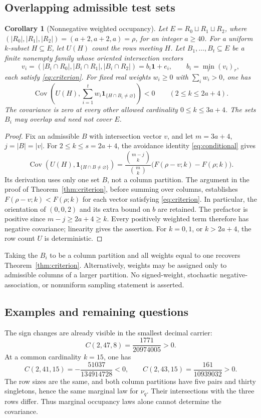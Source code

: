 \documentclass[11pt,a4paper]{article}
\newtheorem{corollary}[theorem]{Corollary}
\theoremstyle{remark}
\DeclareMathOperator{\Cov}{Cov}
\newcommand{\one}{\mathbf 1}
\numberwithin{equation}{section}
\begin{document}
\subsection{Overlapping admissible test sets}

\begin{corollary}[Nonnegative weighted occupancy]\label{cor:weighted}
Let \(E=R_0\sqcup R_1\sqcup R_2\), where
\((|R_0|,|R_1|,|R_2|)=(a+2,a+2,a)=\rho\), for an integer \(a\ge40\).
For a uniform \(k\)-subset \(H\subseteq E\), let \(U(H)\) count
the rows meeting \(H\).
Let \(B_1,\ldots,B_t\subseteq E\) be a finite nonempty family
whose oriented intersection vectors
\[
 v_i=(|B_i\cap R_0|,|B_i\cap R_1|,|B_i\cap R_2|)
     =b_i\one+e_i,\qquad b_i=\min_r(v_i)_r,
\]
each satisfy \eqref{eq:criterion}.
For fixed real weights \(w_i\ge0\) with \(\sum_iw_i>0\), one has
\[
 \Cov\left(U(H),\sum_{i=1}^t
 w_i\one_{\{H\cap B_i\ne\varnothing\}}\right)<0
 \qquad(2\le k\le2a+4).
\]
The covariance is zero at every other allowed cardinality
\(0\le k\le3a+4\). The sets \(B_i\) may overlap and need not cover \(E\).
\end{corollary}
\begin{proof}
Fix an admissible \(B\) with intersection vector \(v\), and let
\(m=3a+4\), \(j=|B|=|v|\).
For \(2\le k\le s=2a+4\), the avoidance identity
\eqref{eq:conditional} gives
\[
 \Cov(U(H),\one_{\{H\cap B\ne\varnothing\}})
 =\frac{\binom{m-j}{k}}{\binom mk}
   \bigl(F(\rho-v;k)-F(\rho;k)\bigr).
\]
Its derivation uses only one set \(B\), not a column partition.
The argument in the proof of Theorem~\ref{thm:criterion},
before summing over columns, establishes
\(F(\rho-v;k)<F(\rho;k)\) for each vector satisfying
\eqref{eq:criterion}. In particular, the orientation of \((0,0,2)\)
and its extra bound on \(b\) are retained.
The prefactor is positive since \(m-j\ge2a+4\ge k\).
Every positively weighted term therefore has negative covariance;
linearity gives the assertion. For \(k=0,1\), or \(k>2a+4\),
the row count \(U\) is deterministic.
\end{proof}

Taking the \(B_i\) to be a column partition and all weights equal to
one recovers Theorem~\ref{thm:criterion}. Alternatively, weights may
be assigned only to admissible columns of a larger partition.
No signed-weight, stochastic negative-association, or nonuniform
sampling statement is asserted.

\subsection{Examples and remaining questions}
The sign changes are already visible in the smallest decimal carrier:
\[
 C(2,47,8)=\frac{1771}{20974005}>0.
\]
At a common cardinality \(k=15\), one has
\[
 C(2,41,15)=-\frac{51037}{134914728}<0,\qquad
 C(2,43,15)=\frac{161}{10939032}>0.
\]
The row sizes are the same, and both column partitions have five
pairs and thirty singletons, hence the same marginal law for
\(\nu_q\). Their intersections with the three rows differ.
Thus marginal occupancy laws alone cannot determine the covariance.
\end{document}
